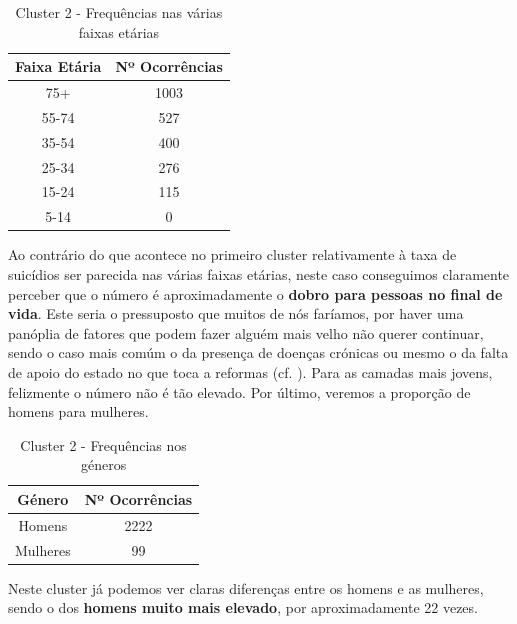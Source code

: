 \documentclass[a4paper,12pt]{article}
\begin{document}
\begin{table}[H]
	\centering
	\caption{Cluster 2 - Frequências nas várias faixas etárias}
	\begin{tabular}{|c|c|} 
		\hline
		\rowcolor[rgb]{0.678,1,0.851} Faixa Etária & Nº Ocorrências  \\ 
		\hline
		75+                                        & 1003            \\ 
		\hline
		55-74                                      & 527             \\ 
		\hline
		35-54                                      & 400             \\ 
		\hline
		25-34                                      & 276             \\ 
		\hline
		15-24                                      & 115             \\ 
		\hline
		5-14                                       & 0               \\
		\hline
	\end{tabular}
\end{table}

Ao contrário do que acontece no primeiro cluster relativamente à taxa de suicídios ser parecida nas várias faixas etárias, neste caso conseguimos claramente perceber que o número é aproximadamente o \textbf{dobro para pessoas no final de vida}. Este seria o pressuposto que muitos de nós faríamos, por haver uma panóplia de fatores que podem fazer alguém mais velho não querer continuar, sendo o caso mais comúm o da presença de doenças crónicas ou mesmo o da falta de apoio do estado no que toca a reformas (cf. \cite{suicidioidosos}). 
Para as camadas mais jovens, felizmente o número não é tão elevado.
Por último, veremos a proporção de homens para mulheres.
\begin{table}[H]
	\centering
	\caption{Cluster 2 - Frequências nos géneros}
	\begin{tabular}{|c|c|} 
		\hline
		\rowcolor[rgb]{0.2,0.7,0.6} Género   & Nº Ocorrências  \\ 
		\hline
		Homens & 2222            \\ 
		\hline
		Mulheres   & 99            \\
		\hline
	\end{tabular}
\end{table}

Neste cluster já podemos ver claras diferenças entre os homens e as mulheres, sendo o dos \textbf{homens muito mais elevado}, por aproximadamente 22 vezes.
\end{document}
